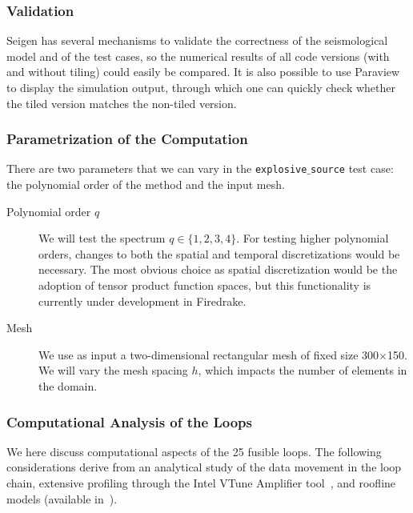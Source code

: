 \subsubsection{Validation}
Seigen has several mechanisms to validate the correctness of the seismological model and of the test cases, so the numerical results of all code versions (with and without tiling) could easily be compared. It is also possible to use Paraview to display the simulation output, through which one can quickly check whether the tiled version matches the non-tiled version.

\subsubsection{Parametrization of the Computation}
There are two parameters that we can vary in the {\tt explosive$\_$source} test case: the polynomial order of the method and the input mesh. 

\begin{description}
\item[Polynomial order $q$] We will test the spectrum $q \in \lbrace 1, 2, 3, 4 \rbrace$. For testing higher polynomial orders, changes to both the spatial and temporal discretizations would be necessary. The most obvious choice as spatial discretization would be the adoption of tensor product function spaces, but this functionality is currently under development in Firedrake.
\item[Mesh] We use as input a two-dimensional rectangular mesh of fixed size 300$\times$150. We will vary the mesh spacing $h$, which impacts the number of elements in the domain.
\end{description}  

\subsubsection{Computational Analysis of the Loops}
We here discuss computational aspects of the 25 fusible loops. The following considerations derive from an analytical study of the data movement in the loop chain, extensive profiling through the Intel VTune Amplifier tool~\citep{vtune}, and roofline models (available in~\cite{Seigen-paper}).

